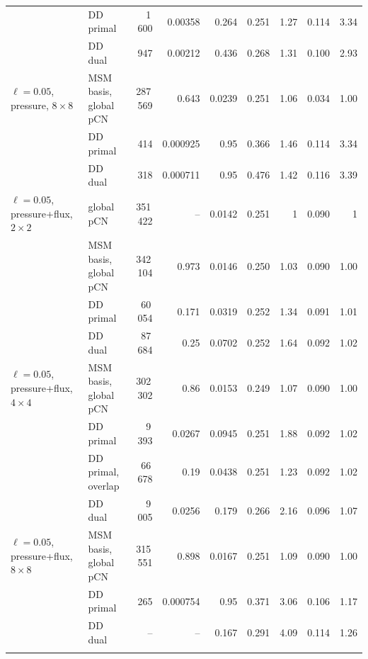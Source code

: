 \begin{tabular}{llrrrrrrr}
 & DD primal & 1\,600 & 0.00358 & 0.264 & 0.251 & 1.27 & 0.114 & 3.34 \\
 & DD dual & 947 & 0.00212 & 0.436 & 0.268 & 1.31 & 0.100 & 2.93 \\
\addlinespace
$\ell=0.05$, pressure, $8\times8$ & MSM basis, global pCN & 287\,569 & 0.643 & 0.0239 & 0.251 & 1.06 & 0.034 & 1.00 \\
 & DD primal & 414 & 0.000925 & 0.95 & 0.366 & 1.46 & 0.114 & 3.34 \\
 & DD dual & 318 & 0.000711 & 0.95 & 0.476 & 1.42 & 0.116 & 3.39 \\
\addlinespace
$\ell=0.05$, pressure+flux, $2\times2$ & global pCN & 351\,422 & -- & 0.0142 & 0.251 & 1 & 0.090 & 1 \\
 & MSM basis, global pCN & 342\,104 & 0.973 & 0.0146 & 0.250 & 1.03 & 0.090 & 1.00 \\
 & DD primal & 60\,054 & 0.171 & 0.0319 & 0.252 & 1.34 & 0.091 & 1.01 \\
 & DD dual & 87\,684 & 0.25 & 0.0702 & 0.252 & 1.64 & 0.092 & 1.02 \\
\addlinespace
$\ell=0.05$, pressure+flux, $4\times4$ & MSM basis, global pCN & 302\,302 & 0.86 & 0.0153 & 0.249 & 1.07 & 0.090 & 1.00 \\
 & DD primal & 9\,393 & 0.0267 & 0.0945 & 0.251 & 1.88 & 0.092 & 1.02 \\
 & DD primal, overlap & 66\,678 & 0.19 & 0.0438 & 0.251 & 1.23 & 0.092 & 1.02 \\
 & DD dual & 9\,005 & 0.0256 & 0.179 & 0.266 & 2.16 & 0.096 & 1.07 \\
\addlinespace
$\ell=0.05$, pressure+flux, $8\times8$ & MSM basis, global pCN & 315\,551 & 0.898 & 0.0167 & 0.251 & 1.09 & 0.090 & 1.00 \\
 & DD primal & 265 & 0.000754 & 0.95 & 0.371 & 3.06 & 0.106 & 1.17 \\
 & DD dual & -- & -- & 0.167 & 0.291 & 4.09 & 0.114 & 1.26 \\
\addlinespace
\bottomrule
\end{tabular}
